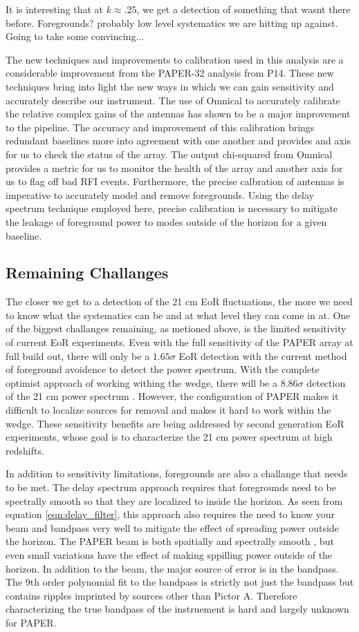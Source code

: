 \documentclass[twocolumn,numberedappendix]{emulateapj} \shorttitle{PSA64}
\begin{document}
It is interesting that at $k\approx.25$, we get a detection of something that
wasnt there before. Foregrounds? probably low level systematics we are hitting
up against. Going to take some convincing...

The new techniques and improvements to calibration used in this analysis are a
considerable improvement from the PAPER-32 analysis from P14.
These new techniques bring into light the new ways in
which we can gain sensitivity and accurately describe our instrument. The use of
Omnical to accurately calibrate the relative complex gains of the antennas has
shown to be a major improvement to the pipeline. The accuracy and improvement of
this calibration brings redundant baselines more into agreement with one another
and provides and axis for us to check the status of the array. The output 
chi-squared from Omnical provides a metric for us to monitor the health of the
array and another axis for us to flag off bad RFI events. Furthermore, the
precise calbration of antennas is imperative to accurately model and remove
foregrounds. Using the delay spectrum technique employed here, precise
calibration is necessary to mitigate the leakage of foreground power to modes
outside of the horizon for a given baseline. 

\subsection{Remaining Challanges}
The closer we get to a detection of the 21 cm EoR fluctuations, the more we need
to know what the systematics can be and at what level they can come in at. One
of the biggest challanges remaining, as metioned above, is the limited
sensitivity of current EoR experiments. Even with the full sensitivity of the
PAPER array at full build out, there will only be a $1.65\sigma$ EoR detection
with the current method of foreground avoidence to detect the power spectrum.
With the complete optimist approach of working withing the wedge, there will be
a $8.86\sigma$ detection of the 21 cm power spectrum \citep{pober_et_al2014}.
However, the configuration of PAPER makes it difficult to localize sources for
removal and makes it hard to work within the wedge. These sensitivity benefits
are being addressed by second generation EoR experiments, whose goal is to
characterize the 21 cm power spectrum at high redshifts.

In addition to sensitivity limitations, foregrounds are also a challange that
needs to be met. The delay spectrum approach requires that foregrounds need to
be spectrally smooth so that they are localized to inside the horizon. As seen
from equation \ref{eqn:delay_filter}, this approach also requires the need to
know your beam and bandpass very well to mitigate the effect of spreading power
outside the horizon. The PAPER beam is both spaitially and spectrally smooth
\cite{pober_et_al2012}, but even small variations have the effect of
making sppilling power outside of the horizon. In addition to the beam, the
major source of error is in the bandpass. The 9th order polynomial fit to the
bandpass is strictly not just the bandpass but contains ripples imprinted by
sources other than Pictor A. Therefore characterizing the true bandpass of the
instruement is hard and largely unknown for PAPER.
\end{document}
